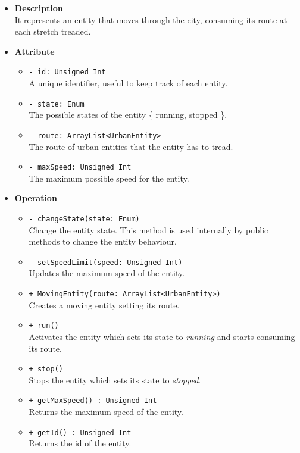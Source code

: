 \begin{itemize}
  \item \textbf{Description} \\
    It represents an entity that moves through the city, consuming its 
route at each stretch treaded.
  \item \textbf{Attribute}
  \begin{itemize}
    \item \texttt{- id: Unsigned Int} \\
A unique identifier, useful to keep track of each entity.
    \item \texttt{- state: Enum} \\
The possible states of the entity \{ running, stopped \}.
    \item \texttt{- route: ArrayList<UrbanEntity>} \\
The route of urban entities that the entity has to tread.
    \item \texttt{- maxSpeed: Unsigned Int} \\
The maximum possible speed for the entity.
  \end{itemize}
  \item \textbf{Operation}
  \begin{itemize}
    \item \texttt{- changeState(state: Enum)} \\
Change the entity state. This method is used internally by public methods to 
change the entity behaviour.
    \item \texttt{- setSpeedLimit(speed: Unsigned Int)} \\
Updates the maximum speed of the entity.
    \item  \texttt{+ MovingEntity(route: ArrayList<UrbanEntity>)} \\
Creates a moving entity setting its route.
    \item  \texttt{+ run()} \\
Activates the entity which sets its state to \textit{running} and 
starts consuming its route.
    \item  \texttt{+ stop()} \\
Stops the entity which sets its state to \textit{stopped}.
   \item  \texttt{+ getMaxSpeed() : Unsigned Int} \\
Returns the maximum speed of the entity.
     \item  \texttt{+ getId() : Unsigned Int} \\
Returns the id of the entity. 

\end{itemize}
\end{itemize}
